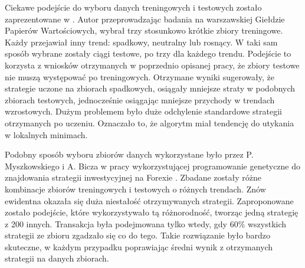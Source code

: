 \documentclass[twoside]{iisthesis}
\begin{document}
Ciekawe podejście do wyboru danych treningowych i testowych zostało zaprezentowane w \cite{GPW}. Autor przeprowadzając badania na warszawskiej Giełdzie Papierów Wartościowych, wybrał trzy stosunkowo krótkie zbiory treningowe. Każdy przejawiał inny trend: spadkowy, neutralny lub rosnący. W taki sam sposób wybrane zostały ciągi testowe, po trzy dla każdego trendu. Podejście to korzysta z wniosków otrzymanych w poprzednio opisanej pracy,  że zbiory testowe nie muszą występować po treningowych. Otrzymane wyniki sugerowały, że strategie uczone na zbiorach spadkowych, osiągały mniejsze straty w podobnych zbiorach testowych, jednocześnie osiągając mniejsze przychody w trendach wzrostowych. Dużym problemem było duże odchylenie standardowe strategii otrzymanych po uczeniu. Oznaczało to, że algorytm miał tendencję do utykania w lokalnych minimach.

Podobny sposób wyboru zbiorów danych wykorzystane było przez P. Myszkowskiego i A. Bicza w pracy wykorzystującej programowanie genetyczne do znajdowania strategii inwestycyjnej na Forexie \cite{Bicz}. Zbadane zostały różne kombinacje zbiorów treningowych i testowych o różnych trendach. Znów ewidentna okazała się duża niestałość otrzymywanych strategii. Zaproponowane zostało podejście, które wykorzystywało tą różnorodność, tworząc jedną strategię z 200 innych. Transakcja była podejmowana tylko wtedy, gdy 60\% wszystkich strategii ze zbioru zgadzało się co do tego. Takie rozwiązanie było bardzo skuteczne, w każdym przypadku poprawiając średni wynik z otrzymanych strategii na danych zbiorach.


















\end{document}
